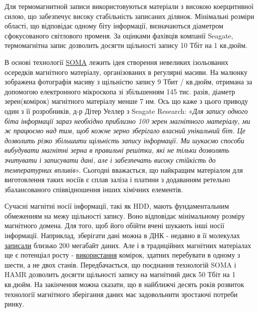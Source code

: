 \documentclass[a4paper,14pt]{extreport}
\begin{document}
Для термомагнитной записи використовуються матеріали з високою коерцитивної силою, що забезпечує високу стабільність записаних ділянок. Мінімальні розміри області, що відповідає одному біту інформації, визначаються діаметром сфокусованого світлового променя. За оцінками фахівців компанії Seagate, термомагнітна запис дозволить досягти щільності запису 10 Тбіт на 1 кв.дюйм.\par

В основі технології \href{https://compress.ru/article.aspx?id=10717&part=51ext1}{SOMA} лежить ідея створення невеликих ізольованих осередків магнітного матеріалу, організованих в регулярні масиви. На малюнку зображена фотографія масиву з щільністю запису 9 Тбит / кв.дюйм, отримана за допомогою електронного мікроскопа зі збільшенням 145 тис. разів, діаметр зерен(комірок) магнітного матеріалу менше 7 нм. Ось що каже з цього приводу один з її розробників, д-р Дітер Уеллер з Seagate Research: «\textit{Для запису одного біта інформації зараз необхідно приблизно 100 зерен магнітного матеріалу, ми ж працюємо над тим, щоб кожне зерно зберігало власний унікальний біт. Це дозволить різко збільшити щільність запису інформації. Ми шукаємо способи вибудувати магнітні зерна в правильні решітки, які не тільки дозволять зчитувати і записувати дані, але і забезпечать високу стійкість до температурних впливів}». Сьогодні вважається, що найкращим матеріалом для виготовлення таких носіїв є сплав заліза і платини з додаванням ретельно збалансованого співвідношення інших хімічних елементів.


Сучасні магнітні носії інформації, такі як HDD, мають фундаментальним обмеженням на межу щільності запису. Воно відповідає мінімальному розміру магнітного домена. Для того, щоб його обійти вчені шукають інші носії інформації. Наприклад, зберігати дані можна в ДНК - недавно в її молекулах \href{https://nplus1.ru/news/2016/07/07/200-mb-dna}{записали} близько 200 мегабайт даних. Але і в традиційних магнітних матеріалах ще є потенціал росту - \href{https://nplus1.ru/news/2016/05/19/six-state-memory}{використання} комірок, здатних перебувати в одному з шести, а не двох станів. Передбачається, що поєднання технологій SOMA і HAMR дозволить досягти щільності запису на магнітний диск 50 Тбіт на 1 кв.дюйм. На закінчення можна сказати, що в найближчі десять років розвиток технології магнітного зберігання даних має задовольнити зростаючі потреби ринку.\par
\end{document}

